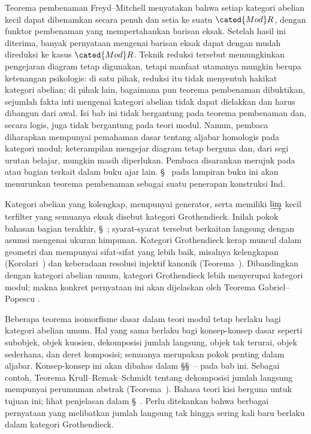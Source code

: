 Teorema pembenaman Freyd--Mitchell
 menyatakan bahwa setiap kategori
abelian kecil dapat dibenamkan secara penuh dan setia ke suatu
$\cated{Mod}R$, dengan funktor pembenaman yang mempertahankan barisan eksak.
Setelah hasil ini diterima, banyak pernyataan mengenai barisan eksak dapat
dengan mudah direduksi ke kasus $\cated{Mod}R$. Teknik reduksi tersebut
memungkinkan pengejaran diagram tetap digunakan, tetapi manfaat utamanya
mungkin berupa ketenangan psikologis: di satu pihak, reduksi itu tidak
menyentuh hakikat kategori abelian; di pihak lain, bagaimana pun teorema
pembenaman dibuktikan,
sejumlah fakta inti mengenai kategori abelian tidak dapat dielakkan dan harus
dibangun dari awal. Isi bab ini tidak bergantung pada teorema pembenaman dan,
secara logis, juga tidak bergantung pada teori modul. Namun, pembaca diharapkan
mempunyai pemahaman dasar tentang aljabar homologis pada kategori modul;
keterampilan mengejar diagram tetap berguna dan, dari segi urutan belajar,
mungkin masih diperlukan. Pembaca disarankan merujuk pada \cite{Li1} atau
bagian terkait dalam buku ajar lain. \S~ pada
lampiran buku ini akan menurunkan teorema pembenaman sebagai suatu penerapan
konstruksi Ind.

Kategori abelian yang kolengkap, mempunyai generator, serta memiliki
$\varinjlim$ kecil terfilter yang semuanya eksak disebut kategori Grothendieck.
Inilah pokok bahasan bagian terakhir,
\S~; syarat-syarat tersebut
berkaitan langsung dengan asumsi mengenai ukuran himpunan. Kategori
Grothendieck kerap muncul dalam geometri dan mempunyai sifat-sifat yang lebih
baik, misalnya kelengkapan
(Korolari~) dan
keberadaan resolusi injektif kanonik
(Teorema~).
Dibandingkan dengan kategori abelian umum, kategori Grothendieck lebih
menyerupai kategori modul; makna konkret pernyataan ini
akan dijelaskan oleh Teorema Gabriel--Popescu
.

Beberapa teorema isomorfisme dasar dalam teori modul tetap berlaku bagi
kategori abelian umum. Hal yang sama berlaku bagi konsep-konsep dasar seperti
subobjek, objek kuosien, dekomposisi jumlah langsung, objek tak terurai, objek
sederhana, dan deret komposisi; semuanya merupakan pokok penting dalam aljabar.
Konsep-konsep ini akan dibahas dalam
\S\S~--%
 pada bab ini. Sebagai contoh, Teorema
Krull--Remak--Schmidt tentang dekomposisi jumlah langsung mempunyai perumuman
abstrak (Teorema~).
Bahasa teori kisi berguna untuk tujuan ini; lihat penjelasan dalam
\S~. Perlu ditekankan bahwa berbagai
pernyataan yang melibatkan jumlah langsung tak hingga sering kali baru berlaku
dalam kategori Grothendieck.

